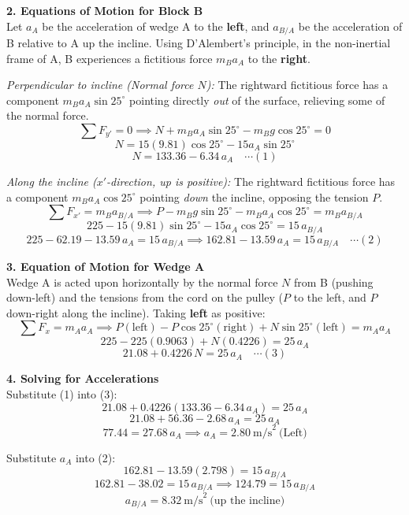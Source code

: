 \documentclass[12pt,a3paper]{article}
\begin{document}
\begin{enumerate}
\begin{tcolorbox}[enhanced,breakable,ansbox,colback=cG!4,colframe=cG,
  boxrule=0.8pt,arc=5pt,
  title={\textbf{Solution}},fonttitle=\bfseries\color{white},
  colbacktitle=cG]
\medskip
\textbf{2. Equations of Motion for Block B}\\[4pt]
Let $a_A$ be the acceleration of wedge A to the \textbf{left}, and $a_{B/A}$ be the acceleration of B relative to A up the incline. Using D'Alembert's principle, in the non-inertial frame of A, B experiences a fictitious force $m_B a_A$ to the \textbf{right}.

\textit{Perpendicular to incline (Normal force $N$):}
The rightward fictitious force has a component $m_B a_A \sin 25^\circ$ pointing directly \textit{out} of the surface, relieving some of the normal force.
\[
  \sum F_{y'} = 0 \implies N + m_B a_A\sin25^\circ - m_B g\cos25^\circ = 0
\]
\[
  N = 15(9.81)\cos25^\circ - 15 a_A\sin25^\circ
\]
\[
  N = 133.36 - 6.34\,a_A \quad\cdots(1)
\]

\textit{Along the incline ($x'$-direction, up is positive):}
The rightward fictitious force has a component $m_B a_A \cos 25^\circ$ pointing \textit{down} the incline, opposing the tension $P$.
\[
  \sum F_{x'} = m_B a_{B/A} \implies P - m_B g\sin25^\circ - m_B a_A\cos25^\circ = m_B a_{B/A}
\]
\[
  225 - 15(9.81)\sin25^\circ - 15 a_A\cos25^\circ = 15\,a_{B/A}
\]
\[
  225 - 62.19 - 13.59\,a_A = 15\,a_{B/A} 
  \implies 162.81 - 13.59\,a_A = 15\,a_{B/A} \quad\cdots(2)
\]

\medskip
\textbf{3. Equation of Motion for Wedge A}\\[4pt]
Wedge A is acted upon horizontally by the normal force $N$ from B (pushing down-left) and the tensions from the cord on the pulley ($P$ to the left, and $P$ down-right along the incline).
Taking \textbf{left} as positive:
\[
  \sum F_x = m_A a_A \implies P (\text{left}) - P\cos25^\circ (\text{right}) + N\sin25^\circ (\text{left}) = m_A a_A
\]
\[
  225 - 225(0.9063) + N(0.4226) = 25\,a_A
\]
\[
  21.08 + 0.4226\,N = 25\,a_A \quad\cdots(3)
\]

\medskip
\textbf{4. Solving for Accelerations}\\[4pt]
Substitute (1) into (3):
\[
  21.08 + 0.4226(133.36 - 6.34\,a_A) = 25\,a_A
\]
\[
  21.08 + 56.36 - 2.68\,a_A = 25\,a_A
\]
\[
  77.44 = 27.68\,a_A \implies \boxed{a_A = 2.80\ \text{m/s}^2\ \text{(Left)}}
\]

Substitute $a_A$ into (2):
\[
  162.81 - 13.59(2.798) = 15\,a_{B/A}
\]
\[
  162.81 - 38.02 = 15\,a_{B/A} \implies 124.79 = 15\,a_{B/A}
\]
\[
  \boxed{a_{B/A} = 8.32\ \text{m/s}^2\ \text{(up the incline)}}
\]

\end{tcolorbox}


\end{enumerate}
\end{document}
